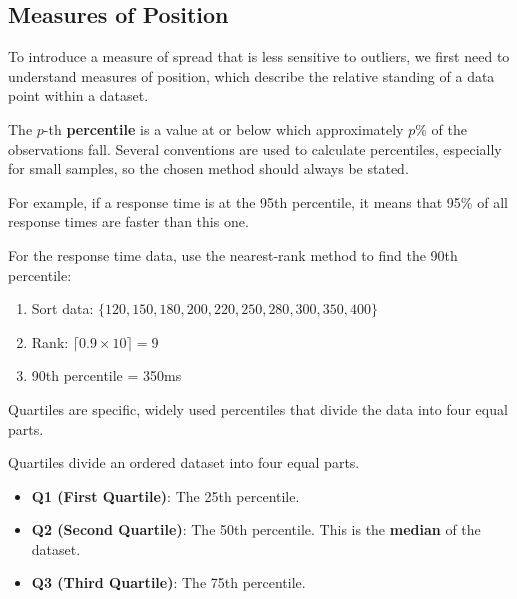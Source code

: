 \subsection*{Measures of Position}

To introduce a measure of spread that is less sensitive to outliers, we first need to understand measures of position, which describe the relative standing of a data point within a dataset.

\begin{definition}[Percentile]
The $p$-th \textbf{percentile} is a value at or below which approximately $p\%$ of the observations fall. Several conventions are used to calculate percentiles, especially for small samples, so the chosen method should always be stated.
\end{definition}

For example, if a response time is at the 95th percentile, it means that 95\% of all response times are faster than this one.

\begin{example}\par

    For the response time data, use the nearest-rank method to find the 90th percentile:
\begin{enumerate}
        \item Sort data: $\{120, 150, 180, 200, 220, 250, 280, 300, 350, 400\}$
        \item Rank: $\lceil 0.9 \times 10\rceil = 9$
        \item 90th percentile = 350ms
\end{enumerate}
    \end{example}

Quartiles are specific, widely used percentiles that divide the data into four equal parts.

\begin{definition}[Quartiles]

Quartiles divide an ordered dataset into four equal parts.

\begin{itemize}
    \item \textbf{Q1 (First Quartile)}: The 25th percentile.
    \item \textbf{Q2 (Second Quartile)}: The 50th percentile. This is the \textbf{median} of the dataset.
    \item \textbf{Q3 (Third Quartile)}: The 75th percentile.
\end{itemize}
\end{definition}

